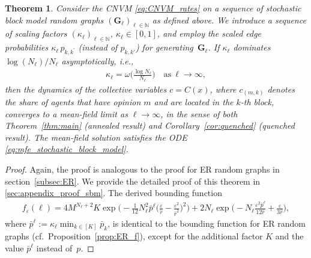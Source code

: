 \documentclass[a4paper,
               10pt,
               pdftex,
               normalheadings,
               headsepline,
               footsepline,
               headinclude,
               footinclude,
               DIV=14,
               abstracton]
{scrartcl}
\newtheorem{theorem}{Theorem}[section]
\newcommand{\rv}[1]{\bm{#1}}
\newcommand{\review}[1]{{#1}}
\begin{document}
\begin{theorem} \label{thm:sbm}
Consider the CNVM \eqref{eq:CNVM_rates} on a sequence of stochastic block model random graphs $(\rv{G}_\ell)_{\ell \in \mathbb{N}}$ as defined above.
We introduce a sequence of scaling factors $(\kappa_\ell)_{\ell \in \mathbb{N}}$, $\kappa_\ell \in [0, 1]$, and employ the scaled edge probabilities $\kappa_\ell\, p_{k, {k^\prime}}$ (instead of $p_{k,k'}$) for generating~$\rv{G}_\ell$.
If $\kappa_\ell$ dominates $\log(N_\ell)/N_\ell$ asymptotically, i.e.,
\begin{align}
    \kappa_\ell = \omega\Big(\frac{\log N_\ell}{N_\ell}\Big) \quad \text{as}\ \ell \to \infty, 
\end{align}
then the dynamics of the collective variables $c = C(x)$, where $c_{(m,k)}$ denotes the share of agents that have opinion $m$ and are located in the $k$-th block, converges to a mean-field limit as $\ell \to \infty$, \review{in the sense of both Theorem~\ref{thm:main} (annealed result) and Corollary~\ref{cor:quenched} (quenched result)}. The mean-field solution satisfies the ODE \eqref{eq:mfe_stochastic_block_model}.
\end{theorem}
\begin{proof}
    Again, the proof is analogous to the proof for ER random graphs in section~\ref{subsec:ER}. We provide the detailed proof of this theorem in \cref{sec:appendix_proof_sbm}. The derived bounding function
    \begin{align}
    f_\varepsilon(\ell) = 4 M^{N_\ell + 2} K \exp \Big( -\frac{1}{12} N_\ell^2 \bar{p}^\ell \Big(\frac{\varepsilon}{\hat{r}} -  \frac{\varepsilon^2}{\hat{r}^2}\Big)^2\Big) + 2 N_\ell \exp\Big( -N_\ell \frac{\varepsilon^2 \bar{p}^\ell}{12 \hat{r}} + \frac{\varepsilon}{3 \hat{r}} \Big),
    \label{eq:bounding_sbm}
\end{align}
where $\bar{p}^\ell := \kappa_\ell \min_{k \in [K]} \bar{p}_k$, is identical to the bounding function for ER random graphs (cf.\ Proposition~\ref{prop:ER_f}), except for the additional factor $K$ and the value $\bar{p}^\ell$ instead of~$p$.
\end{proof}
\end{document}
